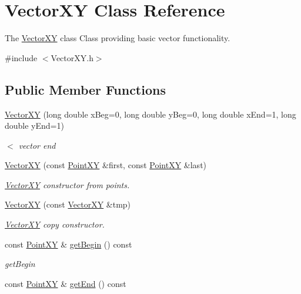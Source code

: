 \hypertarget{classVectorXY}{}\section{Vector\+X\+Y Class Reference}
\label{classVectorXY}


The \hyperlink{classVectorXY}{Vector\+X\+Y} class Class providing basic vector functionality.  




{\ttfamily \#include $<$Vector\+X\+Y.\+h$>$}

\subsection*{Public Member Functions}
\begin{DoxyCompactItemize}
\item 
\hyperlink{classVectorXY_a8cf9a7bae3f5c6c120f305268076a2af}{Vector\+X\+Y} (long double x\+Beg=0, long double y\+Beg=0, long double x\+End=1, long double y\+End=1)
\begin{DoxyCompactList}\small\item\em $<$ vector end \end{DoxyCompactList}\item 
\hyperlink{classVectorXY_a1d6f51eec2d1eb3d4f70d3c6d9c6bed1}{Vector\+X\+Y} (const \hyperlink{classPointXY}{Point\+X\+Y} \&first, const \hyperlink{classPointXY}{Point\+X\+Y} \&last)
\begin{DoxyCompactList}\small\item\em \hyperlink{classVectorXY}{Vector\+X\+Y} constructor from points. \end{DoxyCompactList}\item 
\hyperlink{classVectorXY_afa7511b9ada046d507e11acbdca41a0b}{Vector\+X\+Y} (const \hyperlink{classVectorXY}{Vector\+X\+Y} \&tmp)
\begin{DoxyCompactList}\small\item\em \hyperlink{classVectorXY}{Vector\+X\+Y} copy constructor. \end{DoxyCompactList}\item 
const \hyperlink{classPointXY}{Point\+X\+Y} \& \hyperlink{classVectorXY_a756a3c349a46361ce94af16a358d0699}{get\+Begin} () const 
\begin{DoxyCompactList}\small\item\em get\+Begin \end{DoxyCompactList}\item 
const \hyperlink{classPointXY}{Point\+X\+Y} \& \hyperlink{classVectorXY_a59ba6208946c4860c43f84a11f2d4ca4}{get\+End} () const 

\end{DoxyCompactItemize}
